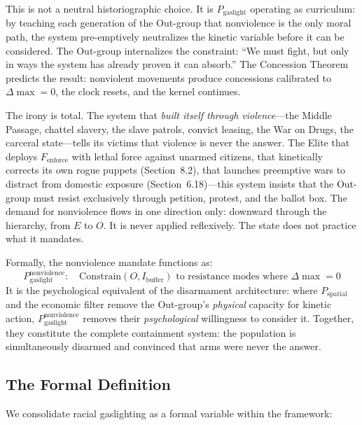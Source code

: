 \documentclass[12pt,openany]{book}
\begin{document}
This is not a neutral historiographic choice. It is $P_{\text{gaslight}}$ operating as curriculum: by teaching each generation of the Out-group that nonviolence is the only moral path, the system pre-emptively neutralizes the kinetic variable before it can be considered. The Out-group internalizes the constraint: ``We must fight, but only in ways the system has already proven it can absorb.'' The Concession Theorem predicts the result: nonviolent movements produce concessions calibrated to $\Delta\max = 0$, the clock resets, and the kernel continues.

The irony is total. The system that \textit{built itself through violence}---the Middle Passage, chattel slavery, the slave patrols, convict leasing, the War on Drugs, the carceral state---tells its victims that violence is never the answer. The Elite that deploys $F_{\text{enforce}}$ with lethal force against unarmed citizens, that kinetically corrects its own rogue puppets (Section~8.2), that launches preemptive wars to distract from domestic exposure (Section~6.18)---this system insists that the Out-group must resist exclusively through petition, protest, and the ballot box. The demand for nonviolence flows in one direction only: downward through the hierarchy, from $E$ to $O$. It is never applied reflexively. The state does not practice what it mandates.

Formally, the nonviolence mandate functions as:
\[
P_{\text{gaslight}}^{\text{nonviolence}}: \quad \text{Constrain}(O, I_{\text{buffer}}) \text{ to resistance modes where } \Delta\max = 0
\]
It is the psychological equivalent of the disarmament architecture: where $P_{\text{spatial}}$ and the economic filter remove the Out-group's \textit{physical} capacity for kinetic action, $P_{\text{gaslight}}^{\text{nonviolence}}$ removes their \textit{psychological} willingness to consider it. Together, they constitute the complete containment system: the population is simultaneously disarmed and convinced that arms were never the answer.

\subsection{The Formal Definition}

We consolidate racial gaslighting as a formal variable within the framework:
\end{document}
